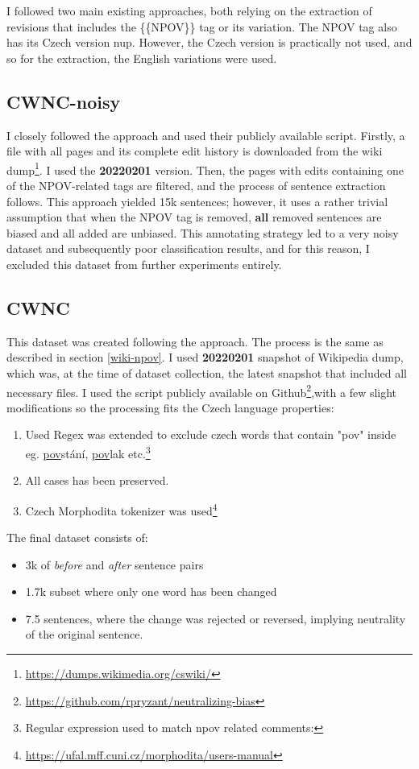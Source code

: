 I followed two main existing approaches, both relying on the extraction of revisions that includes the \{\{NPOV\}\} tag or its variation. The NPOV tag also has its Czech version \Gls{nup}. However, the Czech version is practically not used, and so for the extraction, the English variations were used.





\subsection{CWNC-noisy}
I closely followed the \cite{aleksandrova2019multilingual} approach and used their publicly available script. Firstly, a file with all pages and its complete edit history is downloaded from the wiki dump\footnote{\url{https://dumps.wikimedia.org/cswiki/}}. I used the \textbf{20220201} version. Then, the pages with edits containing one of the NPOV-related tags are filtered, and the process of sentence extraction follows.
This approach yielded 15k sentences; however, it uses a rather trivial assumption that when the NPOV tag is removed, \textbf{all} removed sentences are biased and all added are unbiased. This annotating strategy led to a very noisy dataset and subsequently poor classification results, and for this reason, I excluded this dataset from further experiments entirely.





\subsection{CWNC}\label{wncs}
This dataset was created following the \cite{pryzant2020automatically} approach. The process is the same as described in section \ref{wiki-npov}. I used \textbf{20220201} snapshot of Wikipedia dump, which was, at the time of dataset collection, the latest snapshot that included all necessary files.
I used the script publicly available on Github\footnote{\url{https://github.com/rpryzant/neutralizing-bias}},with a few slight modifications so the processing fits the Czech language properties:
\begin{enumerate}
    \item Used Regex was extended to exclude czech words that contain "pov" inside eg. \underline{pov}stání, \underline{pov}lak etc.\footnote{Regular expression used to match npov related comments: }
    \item All cases has been preserved.
    \item Czech Morphodita tokenizer was used\footnote{\url{https://ufal.mff.cuni.cz/morphodita/users-manual}}
\end{enumerate}
The final dataset consists of:
\begin{itemize}
    \item 3k of \textit{before} and \textit{after} sentence pairs
    \item 1.7k subset where only one word has been changed
    \item 7.5 sentences, where the change was rejected or reversed, implying neutrality of the original sentence.
\end{itemize}

